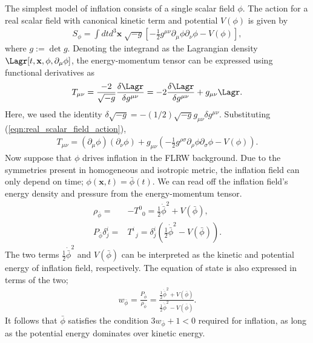 The simplest model of inflation consists of a single scalar field $\phi$. The action for a real scalar field with canonical kinetic term and potential $V(\phi)$ is given by
\begin{align}
	S_\phi = \int dt d^3 \mathbf{x} \; \sqrt{-g} \left[ -\frac{1}{2} g^{\mu\nu} \partial_\mu \phi \partial_\nu \phi - V(\phi) \right],		\label{eqn:real_scalar_field_action}
\end{align}
where $g:=\det g$. Denoting the integrand as the Lagrangian density $\Lagr[t, \mathbf{x}, \phi, \partial_\mu \phi]$, the energy-momentum tensor can be expressed using functional derivatives as
\begin{align}
	T_{\mu\nu} = \frac{-2}{\sqrt{-g}} \frac{\delta\Lagr}{\delta g^{\mu\nu}} = -2 \frac{\delta \Lagr}{\delta g^{\mu\nu}} + g_{\mu\nu} \Lagr.
\end{align}
Here, we used the identity $\delta\sqrt{-g} = -(1/2) \sqrt{-g} g_{\mu\nu} \delta g^{\mu\nu}$. Substituting (\ref{eqn:real_scalar_field_action}),
\begin{align}
	T_{\mu\nu} = \left( \partial_\mu \phi \right) \left( \partial_\nu \phi \right) + g_{\mu\nu} \left( -\frac{1}{2} g^{\rho\sigma} \partial_\rho \phi \partial_\sigma \phi - V(\phi) \right).
\end{align}
Now suppose that $\phi$ drives inflation in the FLRW background. Due to the symmetries present in homogeneous and isotropic metric, the inflation field can only depend on time; $\phi(\mathbf{x}, t) = \bar{\phi}(t)$. We can read off the inflation field's energy density and pressure from the energy-momentum tensor.
\begin{align}
	\rho_{\bar{\phi}} =& -T^0_{\;\;0} = \frac{1}{2} \dot{\bar{\phi}}^2 + V(\bar{\phi}),	\\
	P_{\bar{\phi}} \delta^i_j =& T^i_{\;\;j} = \delta^i_j \left( \frac{1}{2} \dot{\bar{\phi}}^2 - V(\bar{\phi}) \right).
\end{align}
The two terms $\frac{1}{2} \dot{\bar{\phi}}^2$ and $V(\bar{\phi})$ can be interpreted as the kinetic and potential energy of inflation field, respectively. The equation of state is also expressed in terms of the two;
\begin{align}
	w_{\bar{\phi}} = \frac{P_{\bar{\phi}}}{\rho_{\bar{\phi}}} = \frac{\frac{1}{2} \dot{\bar{\phi}}^2 + V(\bar{\phi})}{\frac{1}{2} \dot{\bar{\phi}}^2 - V(\bar{\phi})}.
\end{align}
It follows that $\bar{\phi}$ satisfies the condition $3w_{\bar{\phi}}+1<0$ required for inflation, as long as the potential energy dominates over kinetic energy.

